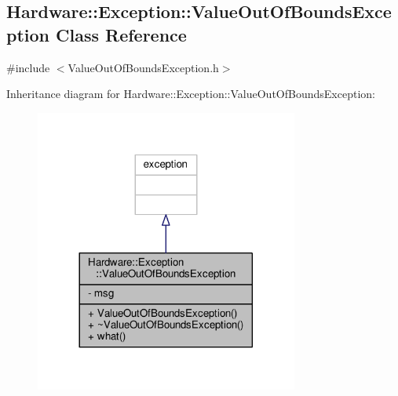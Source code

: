 \hypertarget{class_hardware_1_1_exception_1_1_value_out_of_bounds_exception}{}\subsection{Hardware\+:\+:Exception\+:\+:Value\+Out\+Of\+Bounds\+Exception Class Reference}
\label{class_hardware_1_1_exception_1_1_value_out_of_bounds_exception}


{\ttfamily \#include $<$Value\+Out\+Of\+Bounds\+Exception.\+h$>$}



Inheritance diagram for Hardware\+:\+:Exception\+:\+:Value\+Out\+Of\+Bounds\+Exception\+:
\nopagebreak
\begin{figure}[H]
\begin{center}
\leavevmode
\includegraphics[width=245pt]{class_hardware_1_1_exception_1_1_value_out_of_bounds_exception__inherit__graph}
\end{center}
\end{figure}



